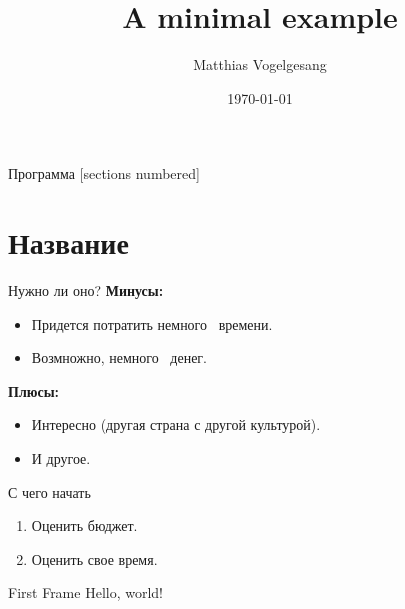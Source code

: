 \documentclass{beamer}
\title{A minimal example}
\date{\today}
\author{Matthias Vogelgesang}
\institute{Centre for Modern Beamer Themes}
\begin{document}
  \maketitle
  \begin{frame}{Программа}
  [sections numbered]
  \tableofcontents[hideallsubsections]
\end{frame}

  \section{Название}
  \begin{frame}{Нужно ли оно?}
    \textbf{Минусы:}
    \begin{itemize}
\item Придется потратить немного \faSmileO\ времени.
\item Возмножно, немного \faSmileO\ денег.
    \end{itemize}

      \textbf{Плюсы:}
    \begin{itemize}
        \item Интересно (другая страна с другой культурой).
        \item И другое.
    \end{itemize}
  \end{frame}

  \begin{frame}{С чего начать}
    \begin{enumerate}
    \item  Оценить бюджет.
    \item Оценить свое время.

    \end{enumerate}
  \end{frame}
  \begin{frame}{First Frame}
    Hello, world!
  \end{frame}
\end{document}
